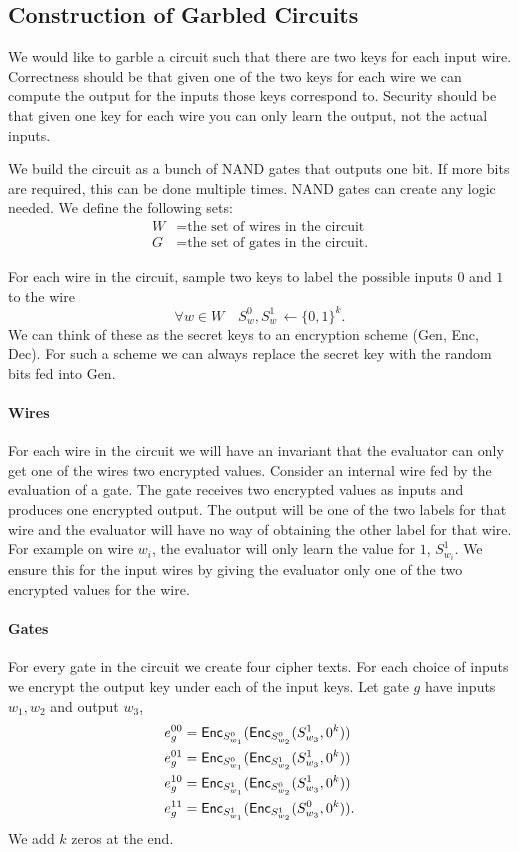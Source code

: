 \subsection{Construction of Garbled Circuits}

We would like to garble a circuit such that there are two keys for each input wire.
Correctness should be that 
given one of the two keys for each wire we can compute the output for the inputs those keys correspond to.
Security should be that 
given one key for each wire you can only learn the output, not the actual inputs.


We build the circuit as a bunch of NAND gates that outputs one bit. 
If more bits are required, this can be done multiple times.
NAND gates can create any logic needed. 
We define the following sets:
\begin{align*}
W &= \text{the set of wires in the circuit}\\
G &= \text{the set of gates in the circuit.}
\end{align*}

For  each wire in the circuit, sample two keys
to label the possible inputs $0$ and $1$  to the wire
\[
\forall w \in W  \quad S_w^0, S_w^1 \,  \leftarrow{} \{0,1\}^k.
\]
We can think of these as the secret keys to an encryption scheme
(Gen, Enc, Dec).
For such a scheme we can always replace the secret key with the random bits fed into Gen.


\paragraph{Wires}
For each wire in the circuit we will have an invariant that the evaluator can only get one of the wires two encrypted values.
Consider an internal wire fed by the evaluation of a gate. The gate receives two encrypted values as inputs
and produces one encrypted output. The output will be one of the two labels for that wire and the evaluator will have no 
way of obtaining the other label for that wire. 
For example on wire $w_i$, the evaluator will only learn the value for $1$,  $S_{w_i}^1$.
We ensure this for the input wires by giving the evaluator only one of the two encrypted values for the wire.

\paragraph{Gates}
For every gate in the circuit we create four cipher texts. 
For each choice of inputs we encrypt the output key under each of the input keys. 
Let gate $g$ have inputs $w_1, w_2$ and output $w_3$,
\begin{align*}
e_g^{00} &= \mathsf{Enc}_{S_{w_1}^0} ( \mathsf{Enc}_{S_{w_2}^0}  ( S_{w_3}^1, 0^k) )\\
e_g^{01} &= \mathsf{Enc}_{S_{w_1}^0} ( \mathsf{Enc}_{S_{w_2}^1}  ( S_{w_3}^1, 0^k) )\\
e_g^{10} &= \mathsf{Enc}_{S_{w_1}^1} ( \mathsf{Enc}_{S_{w_2}^0}  ( S_{w_3}^1, 0^k) )\\
e_g^{11} &= \mathsf{Enc}_{S_{w_1}^1} ( \mathsf{Enc}_{S_{w_2}^1}  ( S_{w_3}^0, 0^k) ).
\end{align*}
We add $k$ zeros at the end.

